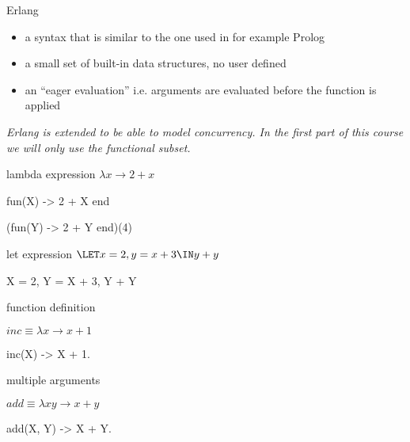 \begin{frame}{Erlang}

 \begin{itemize}
    \pause \item a syntax that is similar to the one used in for example Prolog 

    \pause \item a small set of built-in data structures, no user defined 

    \pause \item an ``eager evaluation'' i.e. arguments are evaluated before the function is applied 
 \end{itemize}

\pause\vspace{40pt}
{\em Erlang is extended to be able to model concurrency. In the first part of this course we will only use the functional subset.}

\end{frame}


\begin{frame}{lambda expression}
  $\lambda x \rightarrow 2 + x$
  \pause

  \begin{code}
   fun(X) -> 2 + X end
  \end{code}

  \begin{code}
    (fun(Y) -> 2 + Y end)(4)
  \end{code}
\end{frame}


\begin{frame}{let expression}
  $\LET x = 2, y = x + 3 \IN y + y $
  \pause

  \begin{code}
    X = 2, Y = X + 3, Y + Y
  \end{code}
\end{frame}


\begin{frame}{function definition}

  $inc \equiv \lambda x \rightarrow x + 1$
  \pause

  \begin{code}
    inc(X) -> X + 1.
  \end{code}

\end{frame}

\begin{frame}{multiple arguments}

  $add \equiv \lambda x y \rightarrow x + y$
  \pause

  \begin{code}
    add(X, Y) -> X + Y.
  \end{code}

\end{frame}

